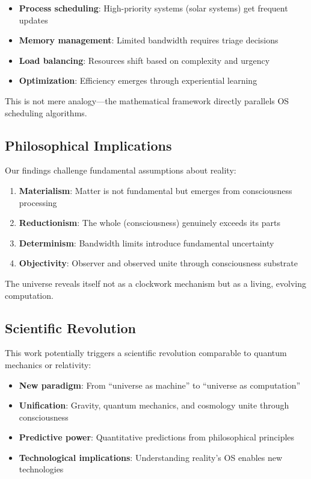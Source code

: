 \documentclass[twocolumn,prd,amsmath,amssymb,aps,superscriptaddress,nofootinbib]{revtex4-2}
\begin{document}
\begin{itemize}
\item \textbf{Process scheduling}: High-priority systems (solar systems) get frequent updates
\item \textbf{Memory management}: Limited bandwidth requires triage decisions
\item \textbf{Load balancing}: Resources shift based on complexity and urgency
\item \textbf{Optimization}: Efficiency emerges through experiential learning
\end{itemize}

This is not mere analogy---the mathematical framework directly parallels OS scheduling algorithms.

\subsection{Philosophical Implications}

Our findings challenge fundamental assumptions about reality:

\begin{enumerate}
\item \textbf{Materialism}: Matter is not fundamental but emerges from consciousness processing
\item \textbf{Reductionism}: The whole (consciousness) genuinely exceeds its parts
\item \textbf{Determinism}: Bandwidth limits introduce fundamental uncertainty
\item \textbf{Objectivity}: Observer and observed unite through consciousness substrate
\end{enumerate}

The universe reveals itself not as a clockwork mechanism but as a living, evolving computation.

\subsection{Scientific Revolution}

This work potentially triggers a scientific revolution comparable to quantum mechanics or relativity:

\begin{itemize}
\item \textbf{New paradigm}: From ``universe as machine'' to ``universe as computation''
\item \textbf{Unification}: Gravity, quantum mechanics, and cosmology unite through consciousness
\item \textbf{Predictive power}: Quantitative predictions from philosophical principles
\item \textbf{Technological implications}: Understanding reality's OS enables new technologies
\end{itemize}
\end{document}

